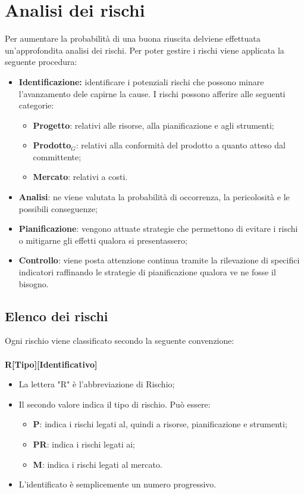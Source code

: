 \chapter{Analisi dei rischi}
Per aumentare la probabilità di una buona riuscita delviene effettuata un'approfondita analisi dei rischi. Per poter gestire i rischi viene applicata la seguente procedura:
\begin{itemize}
	\item \textbf{Identificazione:} identificare i potenziali rischi che possono minare l'avanzamento dele capirne la cause. I rischi possono afferire alle seguenti categorie:
	\begin{itemize}
		\item \textbf{Progetto}: relativi alle risorse, alla pianificazione e agli strumenti;
		\item \textbf{Prodotto$_{G}$}: relativi alla conformità del prodotto a quanto atteso dal committente;
		\item \textbf{Mercato}: relativi a costi.
	\end{itemize}
	\item \textbf{Analisi}: ne viene valutata la probabilità di occorrenza, la pericolosità e le possibili conseguenze;
	\item \textbf{Pianificazione}: vengono attuate strategie che permettono di evitare i rischi o mitigarne gli effetti qualora si presentassero;
	\item \textbf{Controllo}: viene posta attenzione continua tramite la rilevazione di specifici indicatori raffinando le strategie di pianificazione qualora ve ne fosse il bisogno.
\end{itemize}
\section{Elenco dei rischi}
Ogni rischio viene classificato secondo la seguente convenzione:\\\\
\centering \textbf{R[Tipo][Identificativo]}\\
\begin{itemize}
	\item La lettera "R" è l'abbreviazione di Rischio;
	\item Il secondo valore indica il tipo di rischio. Può essere:
	\begin{itemize}
		\item \textbf{P}: indica i rischi legati al, quindi a risorse, pianificazione e strumenti;
		\item \textbf{PR}: indica i rischi legati ai;
		\item \textbf{M}: indica i rischi legati al mercato.
	\end{itemize}
	\item L'identificato è semplicemente un numero progressivo.
\end{itemize}


